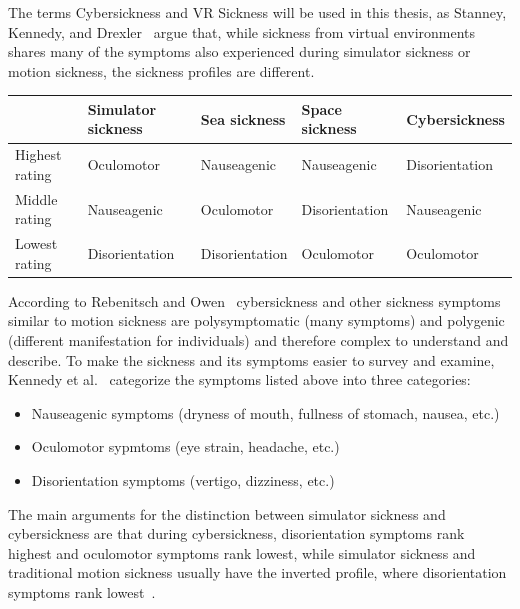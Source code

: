 The terms Cybersickness and VR Sickness will be used in this thesis, as Stanney, Kennedy, and
Drexler~\cite{Stanney1997} argue that, while sickness from virtual environments shares many of the symptoms also
experienced during simulator sickness or motion sickness, the sickness profiles are different.

\begin{center}
    \begin{tabular}{ l l l l l}
        \toprule
        \textbf{ } & \textbf{Simulator sickness} & \textbf{Sea sickness} & \textbf{Space sickness} &
        \textbf{Cybersickness} \\
        \midrule
        Highest rating & Oculomotor & Nauseagenic & Nauseagenic & Disorientation \\
        Middle rating & Nauseagenic & Oculomotor & Disorientation & Nauseagenic \\
        Lowest rating & Disorientation & Disorientation & Oculomotor & Oculomotor \\
        \bottomrule
    \end{tabular}
    \label{tab:symptom-profiles}
\end{center}

According to Rebenitsch and Owen~\cite{Rebenitsch2016} cybersickness and other sickness symptoms similar to motion
sickness are polysymptomatic (many symptoms) and polygenic (different manifestation for individuals) and therefore
complex to understand and describe.
To make the sickness and its symptoms easier to survey and examine, Kennedy et al.~\cite{Kennedy1993} categorize the
symptoms listed above into three categories:
\begin{itemize}
    \item Nauseagenic symptoms (dryness of mouth, fullness of stomach, nausea, etc.)
    \item Oculomotor sypmtoms (eye strain, headache, etc.)
    \item Disorientation symptoms (vertigo, dizziness, etc.)
\end{itemize}
The main arguments for the distinction between simulator sickness and cybersickness are that during cybersickness,
disorientation symptoms rank highest and oculomotor symptoms rank lowest, while simulator sickness and traditional
motion sickness usually have the inverted profile, where disorientation symptoms rank lowest~\cite{Stanney1997}.


